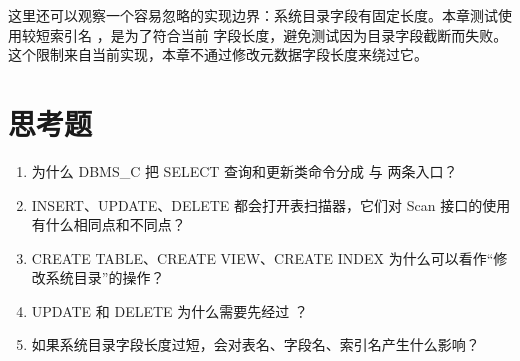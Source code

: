 这里还可以观察一个容易忽略的实现边界：系统目录字段有固定长度。本章测试使用较短索引名 ，是为了符合当前  字段长度，避免测试因为目录字段截断而失败。这个限制来自当前实现，本章不通过修改元数据字段长度来绕过它。

\section{思考题}
\label{sec:update-questions}

\begin{enumerate}
  \item 为什么 DBMS\_C 把 SELECT 查询和更新类命令分成  与  两条入口？
  \item INSERT、UPDATE、DELETE 都会打开表扫描器，它们对 Scan 接口的使用有什么相同点和不同点？
  \item CREATE TABLE、CREATE VIEW、CREATE INDEX 为什么可以看作“修改系统目录”的操作？
  \item UPDATE 和 DELETE 为什么需要先经过 ？
  \item 如果系统目录字段长度过短，会对表名、字段名、索引名产生什么影响？
\end{enumerate}
